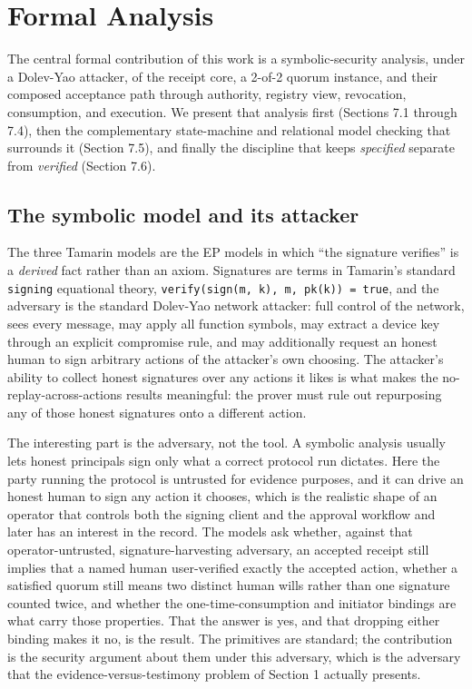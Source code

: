 \documentclass[11pt]{article}
\newcommand{\code}[1]{\texttt{#1}}
\begin{document}
\section{Formal Analysis}

The central formal contribution of this work is a symbolic-security analysis, under
a Dolev-Yao attacker, of the receipt core, a 2-of-2 quorum instance, and their
composed acceptance path through authority, registry view, revocation, consumption,
and execution. We present that analysis first (Sections 7.1 through 7.4), then the
complementary state-machine and relational model checking that surrounds it
(Section 7.5), and finally the discipline that keeps \emph{specified} separate from
\emph{verified} (Section 7.6).

\subsection{The symbolic model and its attacker}

The three Tamarin models are the EP models in which ``the signature verifies'' is a
\emph{derived} fact rather than an axiom. Signatures are terms in Tamarin's
standard \code{signing} equational theory, \code{verify(sign(m, k), m, pk(k)) =
true}, and the adversary is the standard Dolev-Yao network attacker: full control
of the network, sees every message, may apply all function symbols, may extract a
device key through an explicit compromise rule, and may additionally request an
honest human to sign arbitrary actions of the attacker's own choosing. The
attacker's ability to collect honest signatures over any actions it likes is what
makes the no-replay-across-actions results meaningful: the prover must rule out
repurposing any of those honest signatures onto a different action.

The interesting part is the adversary, not the tool. A symbolic analysis usually
lets honest principals sign only what a correct protocol run dictates. Here the
party running the protocol is untrusted for evidence purposes, and it can drive an
honest human to sign any action it chooses, which is the realistic shape of an
operator that controls both the signing client and the approval workflow and later
has an interest in the record. The models ask whether, against that
operator-untrusted, signature-harvesting adversary, an accepted receipt still
implies that a named human user-verified exactly the accepted action, whether a
satisfied quorum still means two distinct human wills rather than one signature
counted twice, and whether the one-time-consumption and initiator bindings are what
carry those properties. That the answer is yes, and that dropping either binding
makes it no, is the result. The primitives are standard; the contribution is the
security argument about them under this adversary, which is the adversary that the
evidence-versus-testimony problem of Section 1 actually presents.
\end{document}
